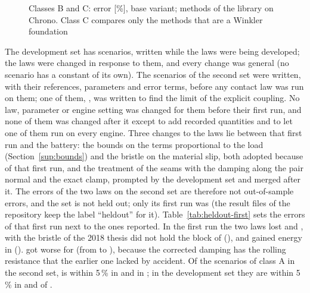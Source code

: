 \begin{figure}[!htbp]
\centering
{}
\caption{Classes B and C: error [\%], base variant; methods of the library on Chrono. Class C
compares only the methods that are a Winkler foundation}
\label{fig:heatmap-BC}
\end{figure}

\begin{table}[!htbp]
\caption{Second set: error [\%] of each method, base variant}
\label{tab:errors-heldout}
\end{table}

The development set has  scenarios, written while the laws were being
developed; the laws were changed in response to them, and every change was general (no scenario
has a constant of its own). The  scenarios of the second set were
written, with their references, parameters and error terms, before any contact law was run on
them; one of them, , was written to find the limit of the explicit coupling. No
law, parameter or engine setting was changed for them before their first run, and none of them
was changed after it except to add recorded quantities and to let one of them run on every
engine. Three changes to the laws lie between that first run and the battery: the bounds on the
terms proportional to the load (Section~\ref{sup:bounds}) and the bristle on the material slip,
both adopted because of that first run, and the treatment of the seams with the damping along
the pair normal and the exact clamp, prompted by the development set and merged after it. The
errors of the two laws on the second set are therefore not out-of-sample errors, and the set is
not held out; only its first run was (the result files of the repository keep the label
``heldout'' for it). Table~\ref{tab:heldout-first} sets the errors of that first run next to
the ones reported. In the first run the two laws lost  and ,
 with the bristle of the 2018 thesis did not hold the block of 
(), and  gained energy in 
().  got worse for  (from
 to ), because the
corrected damping has the rolling resistance that the earlier one lacked by accident. Of the
 scenarios of class A in the second set,  is within
5\,\% in  and  in
; in the development set they are within 5\,\% in
 and  of
.

